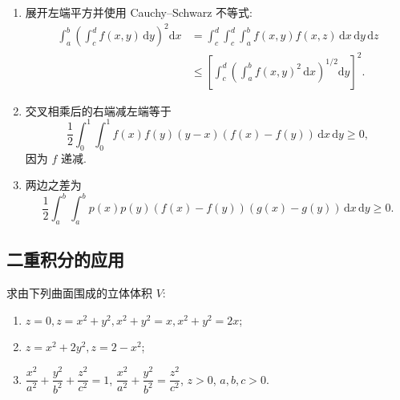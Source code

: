 \begin{solution}
    \leavevmode
    \begin{enumerate}
        \item 展开左端平方并使用 Cauchy--Schwarz 不等式:
              \[
                  \begin{aligned}
                      \int_a^b\left(\int_c^df(x,y)\,\mathrm{d}y\right)^2\mathrm{d}x
                       & =\int_c^d\!\int_c^d\!\int_a^b f(x,y)f(x,z)\,\mathrm{d}x\,\mathrm{d}y\,\mathrm{d}z       \\
                       & \leq\left[\int_c^d\left(\int_a^bf(x,y)^2\,\mathrm{d}x\right)^{1/2}\mathrm{d}y\right]^2.
                  \end{aligned}
              \]
        \item 交叉相乘后的右端减左端等于
              \[
                  \dfrac{1}{2}\int_0^1\!\int_0^1 f(x)f(y)(y-x)(f(x)-f(y))\,\mathrm{d}x\,\mathrm{d}y\geq0,
              \]
              因为 $f$ 递减.
        \item 两边之差为
              \[
                  \dfrac{1}{2}\int_a^b\!\int_a^bp(x)p(y)(f(x)-f(y))(g(x)-g(y))\,\mathrm{d}x\,\mathrm{d}y\geq0.
              \]
    \end{enumerate}
\end{solution}



\subsection{二重积分的应用}

\begin{example}
    求由下列曲面围成的立体体积 $V$:
    \begin{enumerate}
        \item $z=0,z=x^2+y^2,x^2+y^2=x,x^2+y^2=2x$;
        \item $z=x^2+2y^2,z=2-x^2$;
        \item $\dfrac{x^2}{a^2}+\dfrac{y^2}{b^2}+\dfrac{z^2}{c^2}=1$, $\dfrac{x^2}{a^2}+\dfrac{y^2}{b^2}=\dfrac{z^2}{c^2}$, $z>0$, $a,b,c>0$.
    \end{enumerate}
\end{example}
\exampleblank

